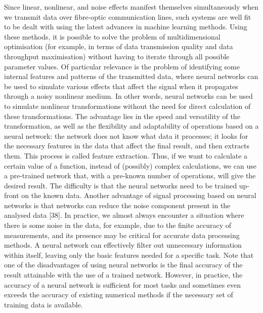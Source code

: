 Since linear, nonlinear, and noise effects manifest themselves simultaneously when we transmit data over fibre-optic communication lines, such systems are well fit to be dealt with using the latest advances in machine learning methods. Using these methods, it is possible to solve the problem of multidimensional optimisation (for example, in terms of data transmission quality and data throughput maximisation) without having to iterate through all possible parameter values.
Of particular relevance is the problem of identifying
some internal features and patterns of the transmitted data, where neural networks can be used to simulate various
effects that affect the signal when it propagates through a noisy nonlinear medium. In other words, neural networks can be used to simulate nonlinear transformations without the need for direct calculation of these transformations. The advantage lies in the speed and versatility of the transformation, as well as the flexibility and adaptability of operations based on a neural network: the network does not know what data it processes; it looks for the necessary features in the data that affect the final result, and then extracts them. This process is called feature extraction. Thus, if we want to calculate a certain value of a function, instead of (possibly) complex calculations, we can use a pre-trained network that, with a pre-known number of operations, will give the desired result. The difficulty is that the neural networks need to be trained up-front on the known data.
Another advantage of signal processing based on neural networks is that networks can reduce the noise component present in the analysed data [38]. In practice, we almost always encounter a situation where there is some noise in the data, for example, due to the finite accuracy of measurements, and its presence may be critical for accurate data processing methods. A neural network can effectively filter out unnecessary information within itself, leaving only the basic features needed for a specific task. Note that one of the disadvantages of using neural networks is the final accuracy of the result attainable with the use of a trained network. However, in practice, the accuracy of a neural network is sufficient for most tasks and sometimes even exceeds the accuracy of existing numerical methods if the necessary set of training data is available.

